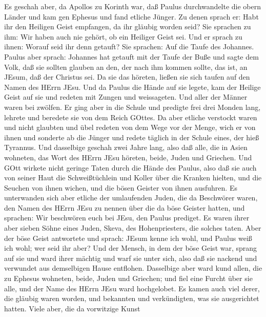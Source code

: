  Es geschah aber, da Apollos zu Korinth war, daß Paulus
durchwandelte die obern Länder und kam gen Ephesus und fand etliche
Jünger.  Zu denen sprach er: Habt ihr den Heiligen Geist
empfangen, da ihr gläubig worden seid? Sie sprachen zu ihm: Wir haben
auch nie gehört, ob ein Heiliger Geist sei.  Und er sprach
zu ihnen: Worauf seid ihr denn getauft? Sie sprachen: Auf die Taufe des
Johannes.  Paulus aber sprach: Johannes hat getauft mit der
Taufe der Buße und sagte dem Volk, daß sie sollten glauben an den, der
nach ihm kommen sollte, das ist, an JEsum, daß der Christus sei.
 Da sie das höreten, ließen sie sich taufen auf den Namen
des HErrn JEsu.  Und da Paulus die Hände auf sie legete, kam
der Heilige Geist auf sie und redeten mit Zungen und weissageten.
 Und aller der Männer waren bei zwölfen.  Er
ging aber in die Schule und predigte frei drei Monden lang, lehrete und
beredete sie von dem Reich GOttes.  Da aber etliche
verstockt waren und nicht glaubten und übel redeten von dem Wege vor der
Menge, wich er von ihnen und sonderte ab die Jünger und redete täglich
in der Schule eines, der hieß Tyrannus.  Und dasselbige
geschah zwei Jahre lang, also daß alle, die in Asien wohneten, das Wort
des HErrn JEsu höreten, beide, Juden und Griechen.  Und
GOtt wirkete nicht geringe Taten durch die Hände des Paulus,
 also daß sie auch von seiner Haut die Schweißtüchlein und
Koller über die Kranken hielten, und die Seuchen von ihnen wichen, und
die bösen Geister von ihnen ausfuhren.  Es unterwanden sich
aber etliche der umlaufenden Juden, die da Beschwörer waren, den Namen
des HErrn JEsu zu nennen über die da böse Geister hatten, und sprachen:
Wir beschwören euch bei JEsu, den Paulus prediget.  Es
waren ihrer aber sieben Söhne eines Juden, Skeva, des Hohenpriesters,
die solches taten.  Aber der böse Geist antwortete und
sprach: JEsum kenne ich wohl, und Paulus weiß ich wohl; wer seid ihr
aber?  Und der Mensch, in dem der böse Geist war, sprang
auf sie und ward ihrer mächtig und warf sie unter sich, also daß sie
nackend und verwundet aus demselbigen Hause entflohen. 
Dasselbige aber ward kund allen, die zu Ephesus wohneten, beide, Juden
und Griechen; und fiel eine Furcht über sie alle, und der Name des HErrn
JEsu ward hochgelobet.  Es kamen auch viel derer, die
gläubig waren worden, und bekannten und verkündigten, was sie
ausgerichtet hatten.  Viele aber, die da vorwitzige Kunst

